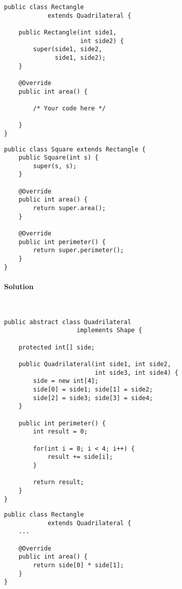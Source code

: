 \vspace*{0.25in}
\begin{minipage}[t]{0.5\linewidth}
\begin{verbatim}
public class Rectangle 
            extends Quadrilateral {

    public Rectangle(int side1, 
                     int side2) {
        super(side1, side2,
              side1, side2);
    }

    @Override
    public int area() {

        /* Your code here */

    }
}
\end{verbatim}
\end{minipage}
\begin{minipage}[t]{0.45\linewidth}
\begin{verbatim}
public class Square extends Rectangle {
    public Square(int s) {
        super(s, s);
    }

    @Override
    public int area() {
        return super.area();
    }

    @Override
    public int perimeter() {
        return super.perimeter();
    }
}
\end{verbatim}
\end{minipage}

\newpage
\paragraph{Solution}~\\

\begin{small}
\begin{minipage}[t]{0.6\linewidth}
\begin{verbatim}
public abstract class Quadrilateral 
                    implements Shape {

    protected int[] side;

    public Quadrilateral(int side1, int side2,
                         int side3, int side4) {
        side = new int[4];
        side[0] = side1; side[1] = side2;
        side[2] = side3; side[3] = side4;
    }

    public int perimeter() {
        int result = 0;

        for(int i = 0; i < 4; i++) {
            result += side[i];
        }

        return result;
    }
}
\end{verbatim}
\end{minipage}
\begin{minipage}[t]{0.45\linewidth}
\begin{verbatim}
public class Rectangle 
            extends Quadrilateral {
    ...

    @Override
    public int area() {
        return side[0] * side[1];
    }
}
\end{verbatim}
\end{minipage}
\end{small}


